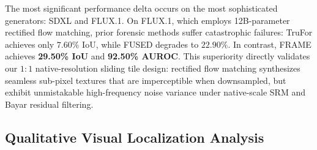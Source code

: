 The most significant performance delta occurs on the most sophisticated generators: SDXL and FLUX.1. On FLUX.1, which employs 12B-parameter rectified flow matching, prior forensic methods suffer catastrophic failures: TruFor achieves only $7.60\%$ IoU, while FUSED degrades to $22.90\%$. In contrast, FRAME achieves \textbf{29.50\% IoU} and \textbf{92.50\% AUROC}. This superiority directly validates our $1:1$ native-resolution sliding tile design: rectified flow matching synthesizes seamless sub-pixel textures that are imperceptible when downsampled, but exhibit unmistakable high-frequency noise variance under native-scale SRM and Bayar residual filtering.

\subsection{Qualitative Visual Localization Analysis}
\label{sec:qualitative}

